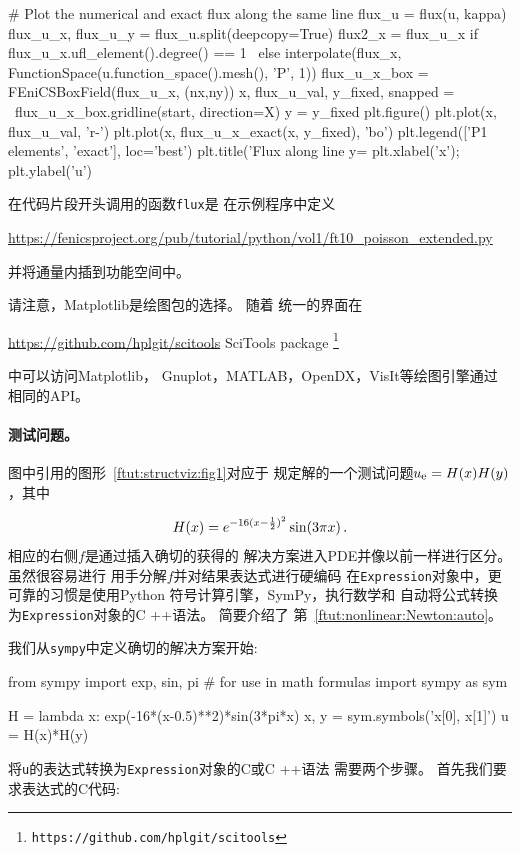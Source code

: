 \begin{python}
    # Plot the numerical and exact flux along the same line
    flux_u = flux(u, kappa)
    flux_u_x, flux_u_y = flux_u.split(deepcopy=True)
    flux2_x = flux_u_x if flux_u_x.ufl_element().degree() == 1 \
              else interpolate(flux_x,
                   FunctionSpace(u.function_space().mesh(), 'P', 1))
    flux_u_x_box = FEniCSBoxField(flux_u_x, (nx,ny))
    x, flux_u_val, y_fixed, snapped = \
       flux_u_x_box.gridline(start, direction=X)
    y = y_fixed
    plt.figure()
    plt.plot(x, flux_u_val, 'r-')
    plt.plot(x, flux_u_x_exact(x, y_fixed), 'bo')
    plt.legend(['P1 elements', 'exact'], loc='best')
    plt.title('Flux along line y=%
    plt.xlabel('x');  plt.ylabel('u')
\end{python}

在代码片段开头调用的函数\texttt{flux}是
在示例程序中定义
\begin{center}
\url{https://fenicsproject.org/pub/tutorial/python/vol1/ft10_poisson_extended.py}
\end{center}
并将通量内插到功能空间中。

请注意，Matplotlib是绘图包的选择。 随着
统一的界面在
\begin{center}
\url{https://github.com/hplgit/scitools} {SciTools package}
\footnote{\texttt{https://github.com/hplgit/scitools}}
\end{center}
中可以访问Matplotlib，
Gnuplot，MATLAB，OpenDX，VisIt等绘图引擎通过
相同的API。


\paragraph{测试问题。}
图中引用的图形~\ref{ftut:structviz:fig1}对应于
规定解的一个测试问题$u_{\mbox{\footnotesize e}} = H(x)H(y)$，其中

\[ H(x) = e^{-16(x-\frac{1}{2})^2}\sin(3\pi x)\thinspace .\]
相应的右侧$f$是通过插入确切的获得的
解决方案进入PDE并像以前一样进行区分。
虽然很容易进行
用手分解$f$并对结果表达式进行硬编码
在\texttt{Expression}对象中，更可靠的习惯是使用Python
符号计算引擎，SymPy，执行数学和
自动将公式转换为\texttt{Expression}对象的C ++语法。
简要介绍了
第~\ref{ftut:nonlinear:Newton:auto}。

我们从\texttt{sympy}中定义确切的解决方案开始:

\begin{python}
from sympy import exp, sin, pi  # for use in math formulas
import sympy as sym

H = lambda x: exp(-16*(x-0.5)**2)*sin(3*pi*x)
x, y = sym.symbols('x[0], x[1]')
u = H(x)*H(y)
\end{python}
将\texttt{u}的表达式转换为\texttt{Expression}对象的C或C ++语法
需要两个步骤。 首先我们要求表达式的C代码:

